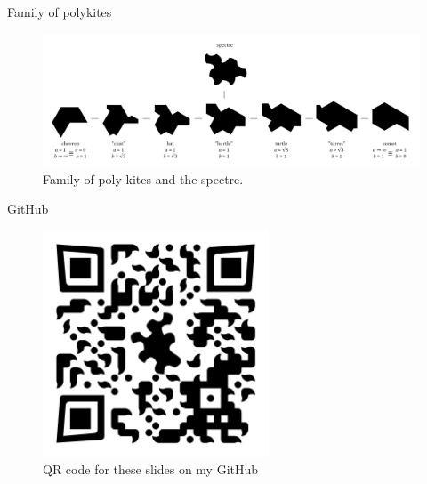 \documentclass{beamer}
\begin{document}
\begin{frame}{Family of polykites}
    \begin{figure}
        \centering
        \includegraphics[width=\textwidth]{images/polykite-family/monotile-continuum.png}
        \caption{Family of poly-kites and the spectre. \cite{steckles2023aperiodicmonotile}}
        \label{fig:poly-kites-spectre}
    \end{figure}
\end{frame}

%     

\begin{frame}{GitHub}
    \begin{figure}
        \centering
        \includegraphics[width=0.6\textwidth]{images/qr-codes/tilling-presentation-github.png}
        \caption{QR code for these slides on my GitHub}
        \label{fig:github-qrcode}
    \end{figure}
\end{frame}
\end{document}
